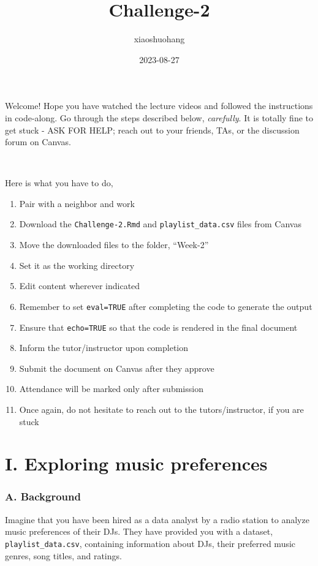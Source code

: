 \documentclass[
]{article}
\title{Challenge-2}
\author{xiaoshuohang}
\date{2023-08-27}
\begin{document}
\maketitle

Welcome! Hope you have watched the lecture videos and followed the
instructions in code-along. Go through the steps described below,
\emph{carefully}. It is totally fine to get stuck - ASK FOR HELP; reach
out to your friends, TAs, or the discussion forum on Canvas.

~

Here is what you have to do,

\begin{enumerate}
\def\labelenumi{\arabic{enumi}.}
\item
  Pair with a neighbor and work
\item
  Download the \texttt{Challenge-2.Rmd} and \texttt{playlist\_data.csv}
  files from Canvas
\item
  Move the downloaded files to the folder, ``Week-2''
\item
  Set it as the working directory
\item
  Edit content wherever indicated
\item
  Remember to set \texttt{eval=TRUE} after completing the code to
  generate the output
\item
  Ensure that \texttt{echo=TRUE} so that the code is rendered in the
  final document
\item
  Inform the tutor/instructor upon completion
\item
  Submit the document on Canvas after they approve
\item
  Attendance will be marked only after submission
\item
  Once again, do not hesitate to reach out to the tutors/instructor, if
  you are stuck
\end{enumerate}

\hypertarget{i.-exploring-music-preferences}{%
\section{I. Exploring music
preferences}\label{i.-exploring-music-preferences}}

\hypertarget{a.-background}{%
\subsubsection{A. Background}\label{a.-background}}

Imagine that you have been hired as a data analyst by a radio station to
analyze music preferences of their DJs. They have provided you with a
dataset, \texttt{playlist\_data.csv}, containing information about DJs,
their preferred music genres, song titles, and ratings.
\end{document}
